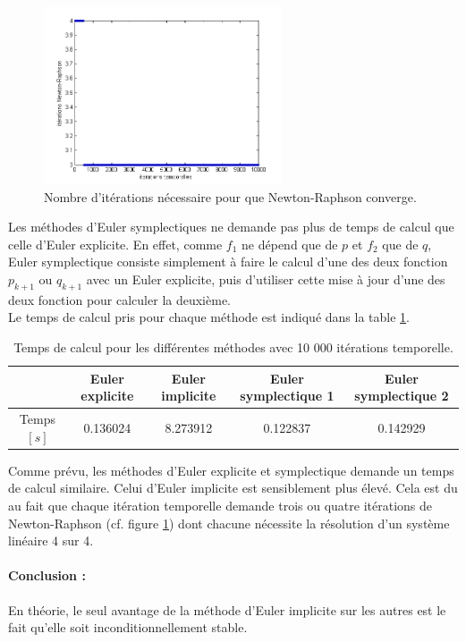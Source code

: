\begin{figure}
\centering
\includegraphics[width=7cm]{images/iterationNR.png}
\caption{Nombre d'itérations nécessaire pour que Newton-Raphson converge.}
\label{IterNR}
\end{figure}

Les méthodes d'Euler symplectiques ne demande pas plus de temps de calcul que celle d'Euler explicite. En effet, comme $f_1$ ne dépend que de $p$ et $f_2$ que de $q$, Euler symplectique consiste simplement à faire le calcul d'une des deux fonction $p_{k+1}$ ou $q_{k+1}$ avec un Euler explicite, puis d'utiliser cette mise à jour d'une des deux fonction pour calculer la deuxième. \\
Le temps de calcul pris pour chaque méthode est indiqué dans la table \ref{table_time}.

\begin{table}[h]
\centering
\begin{tabular}{|c|cccc|}
\hline
 & Euler explicite & Euler implicite & Euler symplectique 1 & Euler symplectique 2 \\
\hline
Temps $[s]$ & 0.136024 & 8.273912 & 0.122837 &  0.142929\\
\hline
\end{tabular}
\caption{Temps de calcul pour les différentes méthodes avec 10 000 itérations temporelle.}
\label{table_time}
\end{table}

Comme prévu, les méthodes d'Euler explicite et symplectique demande un temps de calcul similaire. Celui d'Euler implicite est sensiblement plus élevé. Cela est du au fait que chaque itération temporelle demande trois ou quatre itérations de Newton-Raphson (cf. figure \ref{IterNR}) dont chacune nécessite la résolution d'un système linéaire 4 sur 4.

\paragraph{Conclusion : } En théorie, le seul avantage de la méthode d'Euler implicite sur les autres est le fait qu'elle soit inconditionnellement stable.







